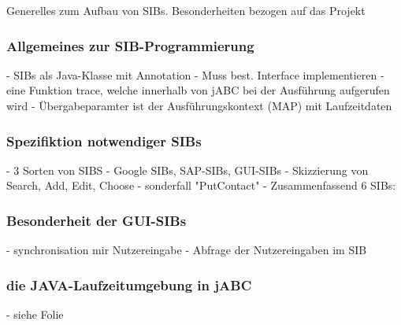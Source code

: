 Generelles zum Aufbau von SIBs. Besonderheiten bezogen auf das Projekt

\subsubsection{Allgemeines zur SIB-Programmierung}
- SIBs als Java-Klasse mit Annotation
- Muss best. Interface implementieren
	- eine Funktion trace, welche innerhalb von jABC bei der Ausführung aufgerufen wird
	- Übergabeparamter ist der Ausführungskontext (MAP) mit Laufzeitdaten
	
\subsubsection{Spezifiktion notwendiger SIBs}	
- 3 Sorten von SIBS
	- Google SIBs, SAP-SIBs, GUI-SIBs
	- Skizzierung von Search, Add, Edit, Choose
	- sonderfall "PutContact"
- Zusammenfassend 6 SIBs:

\subsubsection{Besonderheit der GUI-SIBs}
- synchronisation mir Nutzereingabe
- Abfrage der Nutzereingaben im SIB

\subsubsection{die JAVA-Laufzeitumgebung in jABC}	
- siehe Folie

